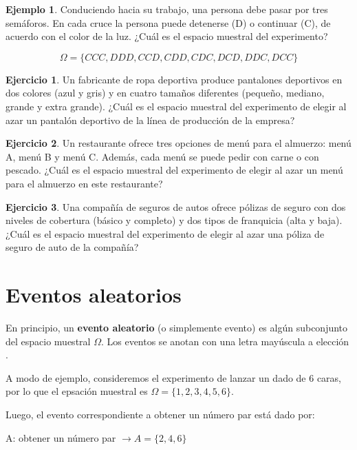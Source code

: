 \documentclass[
  11pt,
]{book}
\theoremstyle{definition}
\theoremstyle{definition}
\newtheorem{example}{Ejemplo}[chapter]
\theoremstyle{definition}
\newtheorem{exercise}{Ejercicio}[chapter]
\theoremstyle{definition}
\theoremstyle{remark}
\begin{document}
\begin{example}
Conduciendo hacia su trabajo, una persona debe pasar por tres semáforos. En cada cruce la persona puede detenerse (D) o continuar (C), de acuerdo con el color de la luz. ¿Cuál es el espacio muestral del experimento?

\[\Omega = \lbrace CCC, DDD, CCD, CDD, CDC, DCD, DDC, DCC \rbrace\]
\end{example}

\begin{exercise}
Un fabricante de ropa deportiva produce pantalones deportivos en dos colores (azul y gris) y en cuatro tamaños diferentes (pequeño, mediano, grande y extra grande). ¿Cuál es el espacio muestral del experimento de elegir al azar un pantalón deportivo de la línea de producción de la empresa?
\end{exercise}

\begin{exercise}
Un restaurante ofrece tres opciones de menú para el almuerzo: menú A, menú B y menú C. Además, cada menú se puede pedir con carne o con pescado. ¿Cuál es el espacio muestral del experimento de elegir al azar un menú para el almuerzo en este restaurante?
\end{exercise}

\begin{exercise}
Una compañía de seguros de autos ofrece pólizas de seguro con dos niveles de cobertura (básico y completo) y dos tipos de franquicia (alta y baja). ¿Cuál es el espacio muestral del experimento de elegir al azar una póliza de seguro de auto de la compañía?
\end{exercise}

\section{Eventos aleatorios}\label{probabilidad-variables-elementos-eventos}

En principio, un \textbf{evento aleatorio} (o simplemente evento) es algún subconjunto del espacio muestral \(\Omega\). Los eventos se anotan con una letra mayúscula a elección \citep[página 153]{anderson}.

A modo de ejemplo, consideremos el experimento de lanzar un dado de 6 caras, por lo que el epsación muestral es \(\Omega = \lbrace 1,2,3,4,5,6 \rbrace\).

Luego, el evento correspondiente a obtener un número par está dado por:

A: obtener un número par \(\rightarrow A = \lbrace 2,4,6 \rbrace\)
\end{document}
